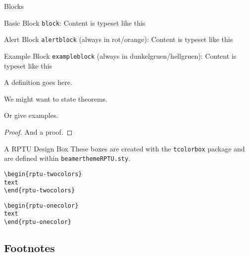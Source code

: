 \begin{frame}{Blocks}
	\begin{block}{Basic Block}
		\texttt{block}: Content is typeset like this
	\end{block}
	\begin{alertblock}{Alert Block}
		\texttt{alertblock} (always in rot/orange): Content is typeset like this
	\end{alertblock}
	\begin{exampleblock}{Example Block}
		\texttt{exampleblock}  (always in dunkelgruen/hellgruen): Content is typeset like this
	\end{exampleblock}
\end{frame}

\begin{frame}
	\begin{definition}
		A definition goes here.
	\end{definition}
	\begin{Theorem}
		We might want to state theorems.
	\end{Theorem}
	\begin{Example}
		Or give examples.
	\end{Example}
	\begin{proof}
		And a proof.
	\end{proof}
\end{frame}

\begin{frame}{A RPTU Design Box}
	These boxes are created with the \texttt{tcolorbox} package and are defined within \texttt{beamerthemeRPTU.sty}.\vspace{1ex}
	
	\begin{rptu-twocolors}
		\texttt{\textbackslash begin\{rptu-twocolors\} \\ text \\ \textbackslash end\{rptu-twocolors\}}
	\end{rptu-twocolors}
	
	\begin{rptu-onecolor}
		\texttt{\textbackslash begin\{rptu-onecolor\} \\ text \\ \textbackslash end\{rptu-onecolor\}}
	\end{rptu-onecolor}
\end{frame}

\subsection{Footnotes}
\rptusectionpage

